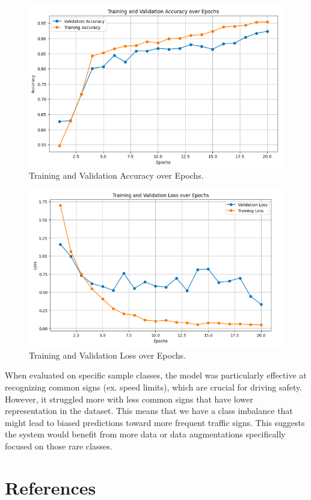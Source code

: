 \documentclass{article} %
\begin{document}
\begin{figure}[h]
\begin{center}
\includegraphics[width=\textwidth]{Figs/Accuracy Graph.png}
\end{center}
\caption{Training and Validation Accuracy over Epochs.}
\end{figure} 
\newpage


\begin{figure}[h]
\begin{center}
\includegraphics[width=\textwidth]{Figs/Loss Graph.png}
\end{center}
\caption{Training and Validation Loss over Epochs.}
\end{figure} 

When evaluated on specific sample classes, the model was particularly effective at recognizing common signs (ex. speed limits), which are crucial for driving safety. However, it struggled more with less common signs that have lower representation in the dataset. This means that we have a class imbalance that might lead to biased predictions toward more frequent traffic signs. This suggests the system would benefit from more data or data augmentations specifically focused on those rare classes.


\section{References}

\label{last_page}



\end{document}
